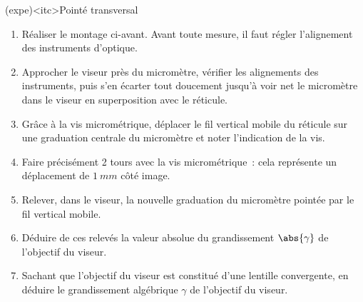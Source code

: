 \documentclass[../main/main.tex]{subfiles}
\begin{document}
{	\begin{tcb}[breakable](expe)<itc>{Pointé transversal}
		\begin{enumerate}
			\item Réaliser le montage ci-avant. Avant toute mesure, il faut régler
			      l'alignement des instruments d'optique.
			\item Approcher le viseur près du micromètre, vérifier les alignements des
			      instruments, puis s'en écarter tout doucement jusqu'à voir net le
			      micromètre dans le viseur en superposition avec le réticule.
			\item Grâce à la vis micrométrique, déplacer le fil vertical mobile du
			      réticule sur une graduation centrale du micromètre et noter
			      l'indication de la vis.
			\item Faire précisément 2 tours avec la vis micrométrique~: cela représente
			      un déplacement de $\SI{1}{mm}$ côté image.
			\item Relever, dans le viseur, la nouvelle graduation du micromètre pointée
			      par le fil vertical mobile.
			\item Déduire de ces relevés la valeur absolue du grandissement
			      $\abs{\gamma}$ de l'objectif du viseur.
			\item Sachant que l'objectif du viseur est constitué d'une lentille
			      convergente, en déduire le grandissement algébrique $\gamma$ de
			      l'objectif du viseur.
		\end{enumerate}
	\end{tcb}
}

\setcounter{subsection}{4}
\end{document}
